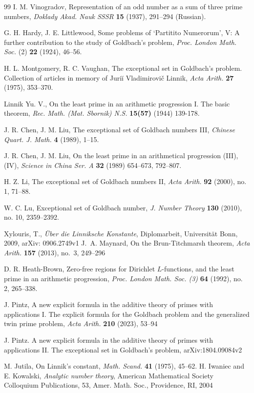 \documentclass[10pt, reqno]{amsart}
\numberwithin{equation}{section}
\begin{document}
\begin{thebibliography}{99}
 I. M. Vinogradov, Representation of an odd number as a sum of three prime numbers, {\it Doklady Akad. Nauk SSSR} {\bf 15} (1937), 291--294 (Russian).



 G. H. Hardy, J. E. Littlewood, Some problems of `Partitito Numerorum', V: A further contribution to the study of Goldbach's problem, {\it Proc. London Math. Soc.} (2) {\bf 22} (1924), 46--56.

 H. L. Montgomery, R. C. Vaughan, The exceptional set in Goldbach's problem. Collection of articles in memory of Juri\u i Vladimirovi\v c Linnik, {\it Acta Arith.} {\bf 27} (1975), 353--370.


Linnik Yu. V., On the least prime in an arithmetic progression I. The basic theorem, \textit{Rec.
Math. (Mat. Sbornik) N.S. }\textbf{15(57)} (1944) 139-178.

 J. R. Chen, J. M. Liu, The exceptional set of Goldbach numbers III, {\it Chinese Quart. J. Math.} {\bf 4} (1989), 1--15.

 J. R. Chen, J. M. Liu, On the least prime in an arithmetical progression (III), (IV), \textit{Science in China Ser. A} \textbf{32} (1989) 654--673, 792--807.

 H. Z. Li, The exceptional set of Goldbach numbers II, {\it Acta Arith.} {\bf 92} (2000), no. 1, 71--88.

 W. C. Lu, Exceptional set of Goldbach number, {\it J. Number Theory} {\bf 130} (2010), no. 10, 2359--2392.

 Xylouris, T., {\it \"Uber die Linniksche Konstante}, Diplomarbeit, Universit\"at Bonn, 2009, arXiv: 0906.2749v1
J.~A. Maynard, On the Brun-Titchmarsh theorem, \textit{Acta Arith.} {\bf 157} (2013), no.~3, 249--296

 D. R. Heath-Brown, Zero-free regions for Dirichlet $L$-functions, and the least prime in an arithmetic progression, {\it Proc. London Math. Soc. (3)} {\bf 64} (1992), no. 2, 265--338.


 J. Pintz, A new explicit formula in the additive theory of primes with applications I. The explicit formula for the Goldbach problem and the generalized twin prime problem, {\it Acta Arith.} {\bf 210} (2023), 53--94


 J. Pintz. A new explicit formula in the additive theory of primes with applications II. The exceptional set in Goldbach's problem, arXiv:1804.09084v2 

 M. Jutila, On Linnik's constant, {\it Math. Scand.} {\bf 41} (1975), 45--62.
 H. Iwaniec and E. Kowalski, {\it Analytic number theory}, American Mathematical Society Colloquium Publications, 53, Amer. Math. Soc., Providence, RI, 2004

\end{thebibliography}
\end{document}
